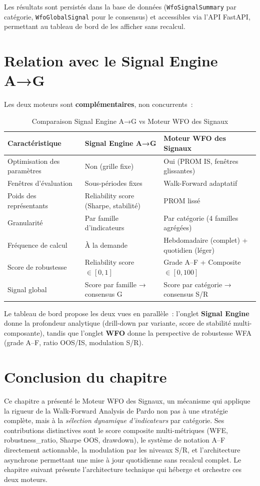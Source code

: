 Les résultats sont persistés dans la base de données (\texttt{WfoSignalSummary}
par catégorie, \texttt{WfoGlobalSignal} pour le consensus) et accessibles via
l'API FastAPI, permettant au tableau de bord de les afficher sans recalcul.

\section{Relation avec le Signal Engine A→G}
\label{sec:wfo_vs_se}

Les deux moteurs sont \textbf{complémentaires}, non concurrents~:

\begin{table}[H]
\centering
\caption{Comparaison Signal Engine A→G vs Moteur WFO des Signaux}
\label{tab:se_vs_wfo}
\begin{tabularx}{\linewidth}{@{}lYY@{}}
\toprule
\textbf{Caractéristique} & \textbf{Signal Engine A→G} & \textbf{Moteur WFO des Signaux} \\
\midrule
Optimisation des paramètres & Non (grille fixe) & Oui (PROM IS, fenêtres glissantes) \\
Fenêtres d'évaluation & Sous-périodes fixes & Walk-Forward adaptatif \\
Poids des représentants & Reliability score (Sharpe, stabilité) & PROM lissé \\
Granularité & Par famille d'indicateurs & Par catégorie (4 familles agrégées) \\
Fréquence de calcul & À la demande & Hebdomadaire (complet) + quotidien (léger) \\
Score de robustesse & Reliability score $\in [0, 1]$ & Grade A–F + Composite $\in [0, 100]$ \\
Signal global & Score par famille → consensus G & Score par catégorie → consensus S/R \\
\bottomrule
\end{tabularx}
\end{table}

Le tableau de bord propose les deux vues en parallèle~: l'onglet \textbf{Signal Engine}
donne la profondeur analytique (drill-down par variante, score de stabilité
multi-composante), tandis que l'onglet \textbf{WFO} donne la perspective de
robustesse WFA (grade A–F, ratio OOS/IS, modulation S/R).

\section*{Conclusion du chapitre}

Ce chapitre a présenté le Moteur WFO des Signaux, un mécanisme qui applique la
rigueur de la Walk-Forward Analysis de Pardo non pas à une stratégie complète,
mais à la \emph{sélection dynamique d'indicateurs} par catégorie. Ses contributions
distinctives sont le score composite multi-métriques (WFE, robustness\_ratio,
Sharpe OOS, drawdown), le système de notation A–F directement actionnable, la
modulation par les niveaux S/R, et l'architecture asynchrone permettant une mise
à jour quotidienne sans recalcul complet. Le chapitre suivant présente l'architecture
technique qui héberge et orchestre ces deux moteurs.
